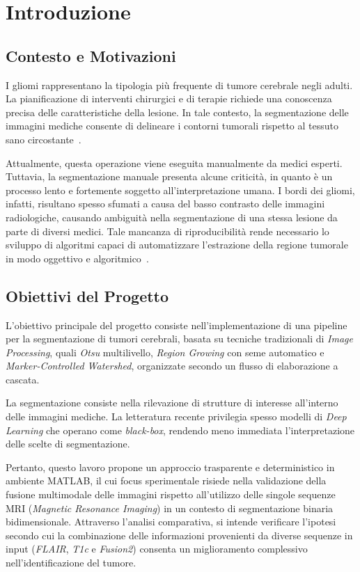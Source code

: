 \chapter{Introduzione}

\section{Contesto e Motivazioni}
I gliomi rappresentano la tipologia più frequente di tumore cerebrale negli adulti. La pianificazione di interventi chirurgici e di terapie richiede una conoscenza precisa delle caratteristiche della lesione. In tale contesto, la segmentazione delle immagini mediche consente di delineare i contorni tumorali rispetto al tessuto sano circostante~\cite{antonelli_medical_2022}.

Attualmente, questa operazione viene eseguita manualmente da medici esperti. Tuttavia, la segmentazione manuale presenta alcune criticità, in quanto è un processo lento e fortemente soggetto all’interpretazione umana. I bordi dei gliomi, infatti, risultano spesso sfumati a causa del basso contrasto delle immagini radiologiche, causando ambiguità nella segmentazione di una stessa lesione da parte di diversi medici. Tale mancanza di riproducibilità rende necessario lo sviluppo di algoritmi capaci di automatizzare l'estrazione della regione tumorale in modo oggettivo e algoritmico~\cite{menze2015}.

\section{Obiettivi del Progetto}
L’obiettivo principale del progetto consiste nell'implementazione di una pipeline per la segmentazione di tumori cerebrali, basata su tecniche tradizionali di \textit{Image Processing}, quali \textit{Otsu} multilivello, \textit{Region Growing} con seme automatico e \textit{Marker-Controlled Watershed}, organizzate secondo un flusso di elaborazione a cascata.

La segmentazione consiste nella rilevazione di strutture di interesse all'interno delle immagini mediche. La letteratura recente privilegia spesso modelli di \textit{Deep Learning} che operano come \textit{black-box}, rendendo meno immediata l’interpretazione delle scelte di segmentazione.

Pertanto, questo lavoro propone un approccio trasparente e deterministico in ambiente MATLAB, il cui focus sperimentale risiede nella validazione della fusione multimodale delle immagini rispetto all'utilizzo delle singole sequenze MRI (\textit{Magnetic Resonance Imaging}) in un contesto di segmentazione binaria bidimensionale.
Attraverso l'analisi comparativa, si intende verificare l’ipotesi secondo cui la combinazione delle informazioni provenienti da diverse sequenze in input (\textit{FLAIR}, \textit{T1c} e  \textit{Fusion2}) consenta un miglioramento complessivo nell’identificazione del tumore.

